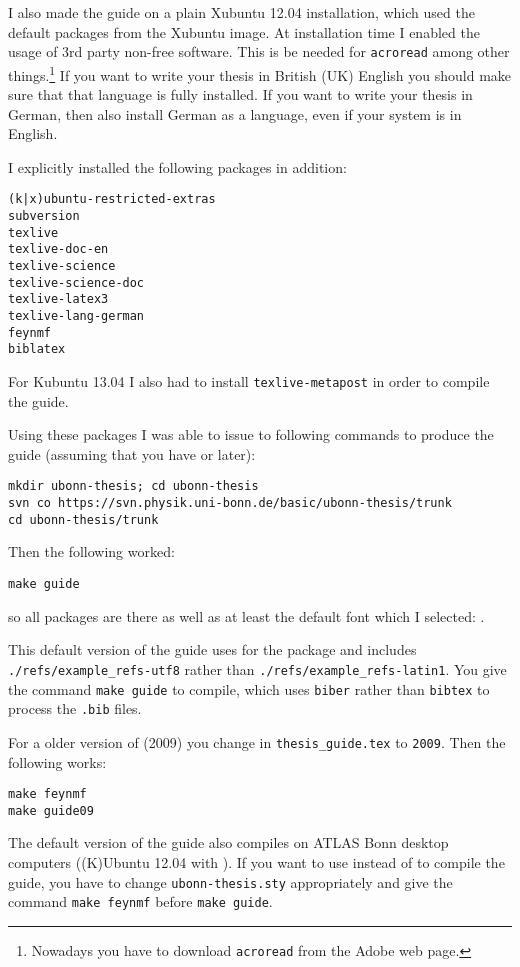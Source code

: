 I also made the guide on a plain Xubuntu 12.04
installation, which used the default packages from the Xubuntu image. At
installation time I enabled the usage of 3rd party non-free
software. This is be needed for \texttt{acroread} among other
things.\footnote{Nowadays you have to download \texttt{acroread} from
  the Adobe web page.} If
you want to write your thesis in British (UK) English you should make sure
that that language is fully installed. If you want to write your
thesis in German, then also install German as a language, even if
your system is in English.

I explicitly installed the following packages in addition:
\begin{verbatim}
(k|x)ubuntu-restricted-extras
subversion
texlive
texlive-doc-en
texlive-science
texlive-science-doc
texlive-latex3
texlive-lang-german
feynmf
biblatex
\end{verbatim}
For Kubuntu 13.04 I also had to install \texttt{texlive-metapost} in
order to compile the guide.

\noindent
Using these packages I was able to issue to following commands to
produce the guide (assuming that you have  or later):
\begin{verbatim}
mkdir ubonn-thesis; cd ubonn-thesis
svn co https://svn.physik.uni-bonn.de/basic/ubonn-thesis/trunk
cd ubonn-thesis/trunk
\end{verbatim}
Then the following worked:
\begin{verbatim}
make guide
\end{verbatim}
so all packages are there as well as at least the default font which I
selected: .

This default version of the guide uses  for the
 package and includes\\
\texttt{./refs/example\_refs-utf8} rather than
\texttt{./refs/example\_refs-latin1}. You give the command \texttt{make
  guide} to compile, which uses \texttt{biber} rather than
\texttt{bibtex} to process the \texttt{.bib} files.

For a older version of \TeXLive (2009) you change
 in \texttt{thesis\_guide.tex} to \texttt{2009}. Then
the following works:
\begin{verbatim}
make feynmf
make guide09
\end{verbatim}

The default version of the guide also compiles on ATLAS Bonn desktop
computers ((K)Ubuntu 12.04 with ). If you want to use
 instead of  to compile the guide, you
have to change \texttt{ubonn-thesis.sty} appropriately and give the
command \texttt{make feynmf} before \texttt{make guide}.


